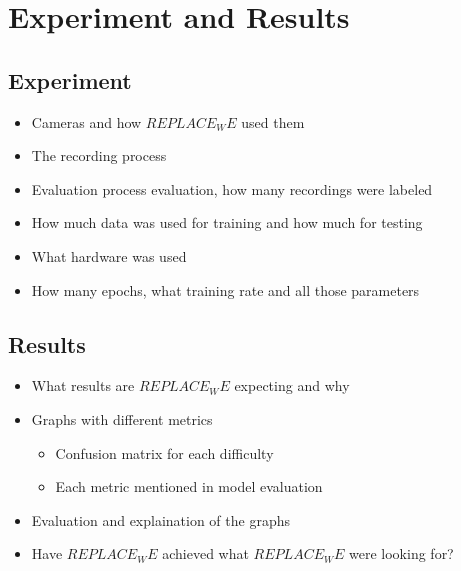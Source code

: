 \chapter{Experiment and Results}

\section{Experiment}
\label{sec:experiment}

\begin{itemize}
  \item Cameras and how $REPLACE_WE$ used them
  \item The recording process
  \item Evaluation process evaluation, how many recordings were labeled
  \item How much data was used for training and how much for testing
  \item What hardware was used
  \item How many epochs, what training rate and all those parameters
\end{itemize}

\section{Results}

\begin{itemize}
  \item What results are $REPLACE_WE$ expecting and why
  \item Graphs with different metrics
  
\begin{itemize}
    \item Confusion matrix for each difficulty
    \item Each metric mentioned in model evaluation
\end{itemize}

  \item Evaluation and explaination of the graphs
  \item Have $REPLACE_WE$ achieved what $REPLACE_WE$ were looking for?
\end{itemize}

